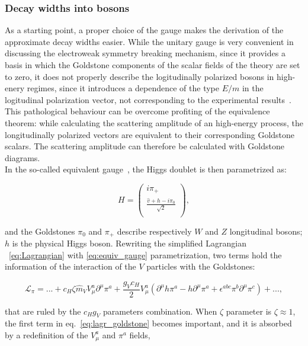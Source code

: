 \subsubsection{Decay widths into bosons}
\label{sec:HVT_decay_bosons}
As a starting point, a proper choice of the gauge makes the derivation of the approximate decay widths easier. While the unitary gauge is very convenient in discussing the electroweak symmetry breaking mechanism, since it provides a basis in which the Goldstone components of the scalar fields of the theory are set to zero, it does not properly describe the logitudinally polarized bosons in high-enery regimes, since it introduces a dependence of the type $E/m$ in the logitudinal polarization vector, not corresponding to the experimental results~\cite{Aad:2014zda,Khachatryan:2014sta}. This pathological behaviour can be overcome profiting of the equivalence theorem: while calculating the scattering amplitude of an high-energy process, the longitudinally polarized vectors are equivalent to their corresponding Goldstone scalars. The scattering amplitude can therefore be calculated with Goldstone diagrams.\\
In the so-called equivalent gauge~\cite{Wulzer:2013mza}, the Higgs doublet is then parametrized as:

\begin{equation}
H =
\begin{pmatrix}
i \pi_+ \\
\frac{\hat{v} + h -i \pi_0}{\sqrt{2}} \\
\end{pmatrix}
,
\label{eq:equiv_gauge}
\end{equation}

\noindent and the Goldstones $\pi_0$ and $\pi_+$ describe respectively $W$ and $Z$ longitudinal bosons; $h$ is the physical Higgs boson. Rewriting the simplified Lagrangian ~\ref{eq:Lagrangian} with \ref{eq:equiv_gauge} parametrization, two terms hold the information of the interaction of the $V$ particles with the Goldstones:

\begin{equation}
\mathcal{L}_{\pi} = ... + c_H \zeta {\hat{m}}_V V_{\mu}^a {\partial}^{\mu} {\pi}^a + \frac{g_V c_H}{2} V_{\mu}^a \left( {\partial}^{\mu} h {\pi}^a - h {\partial}^{\mu} {\pi}^a + {\epsilon}^{abc} \pi^b \partial^{\mu} \pi^c \right) + ...
,
\label{eq:lagr_goldstone}
\end{equation}

\noindent that are ruled by the $c_H g_V$ parameters combination. When $\zeta$ parameter is $\zeta \approx 1$, the first term in eq.~\ref{eq:lagr_goldstone} becomes important, and it is absorbed by a redefinition of the $V_{\mu}^a$ and $\pi^a$ fields,

